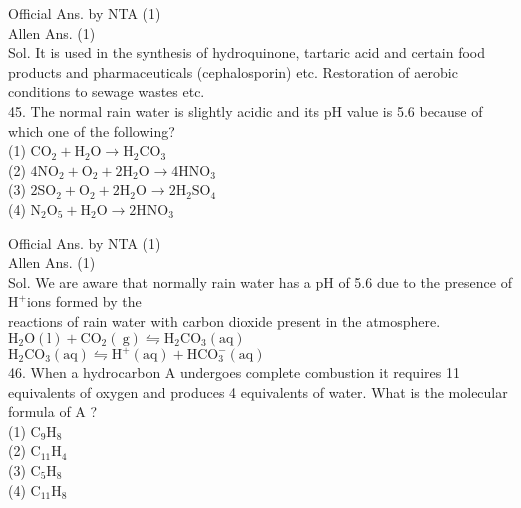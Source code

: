 \documentclass[10pt]{article}
\begin{document}
Official Ans. by NTA (1)\\
Allen Ans. (1)\\
Sol. It is used in the synthesis of hydroquinone, tartaric acid and certain food products and pharmaceuticals (cephalosporin) etc. Restoration of aerobic conditions to sewage wastes etc.\\
45. The normal rain water is slightly acidic and its pH value is 5.6 because of which one of the following?\\
(1) \(\mathrm{CO}_{2}+\mathrm{H}_{2} \mathrm{O} \rightarrow \mathrm{H}_{2} \mathrm{CO}_{3}\)\\
(2) \(4 \mathrm{NO}_{2}+\mathrm{O}_{2}+2 \mathrm{H}_{2} \mathrm{O} \rightarrow 4 \mathrm{HNO}_{3}\)\\
(3) \(2 \mathrm{SO}_{2}+\mathrm{O}_{2}+2 \mathrm{H}_{2} \mathrm{O} \rightarrow 2 \mathrm{H}_{2} \mathrm{SO}_{4}\)\\
(4) \(\mathrm{N}_{2} \mathrm{O}_{5}+\mathrm{H}_{2} \mathrm{O} \rightarrow 2 \mathrm{HNO}_{3}\)

Official Ans. by NTA (1)\\
Allen Ans. (1)\\
Sol. We are aware that normally rain water has a pH of 5.6 due to the presence of \(\mathrm{H}^{+}\)ions formed by the\\
reactions of rain water with carbon dioxide present in the atmosphere.\\
\(\mathrm{H}_{2} \mathrm{O}(\mathrm{l})+\mathrm{CO}_{2}(\mathrm{~g}) \leftrightharpoons \mathrm{H}_{2} \mathrm{CO}_{3}(\mathrm{aq})\)\\
\(\mathrm{H}_{2} \mathrm{CO}_{3}(\mathrm{aq}) \leftrightharpoons \mathrm{H}^{+}(\mathrm{aq})+\mathrm{HCO}_{3}^{-}(\mathrm{aq})\)\\
46. When a hydrocarbon A undergoes complete combustion it requires 11 equivalents of oxygen and produces 4 equivalents of water. What is the molecular formula of A ?\\
(1) \(\mathrm{C}_{9} \mathrm{H}_{8}\)\\
(2) \(\mathrm{C}_{11} \mathrm{H}_{4}\)\\
(3) \(\mathrm{C}_{5} \mathrm{H}_{8}\)\\
(4) \(\mathrm{C}_{11} \mathrm{H}_{8}\)
\end{document}
